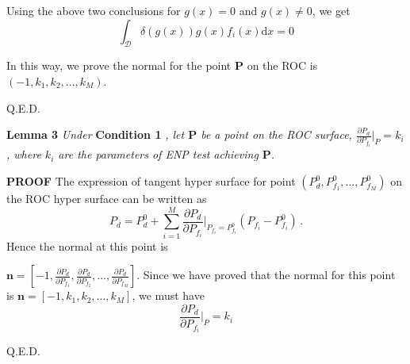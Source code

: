 Using the above two conclusions for $g(x) = 0$ and $g(x) \neq 0$, we get
\begin{equation}
\int_{\mathcal{D}} \delta (g(x)) g(x)f_i(x) \mathrm{d}x = 0
\end{equation}

In this way, we prove the normal for the point \textbf{P} on the ROC is $(-1, k_1, k_2, ..., k_M)$.

Q.E.D.

\noindent \textbf{Lemma 3}
\textit{
\noindent
Under}
\textbf{Condition 1}
\textit{, let $\mathbf{P}$ be a point on the ROC surface, $\frac{\partial P_d}{\partial P_{f_i}} \bigg|_P = k_i$, where $k_i$ are the parameters of ENP test achieving $\mathbf{P}$.
}

\noindent\textbf{PROOF}
The expression of tangent hyper surface for point $(P_d^0, P_{f_1}^0, ..., P_{f_M}^0)$ on the ROC hyper surface can be written as
\begin{equation}
P_d = P_d^0 + \sum_{i=1}^{M} \frac{\partial P_d}{\partial P_{f_i}}\bigg|_{P_{f_i} = P_{f_i}^0}(P_{f_i} - P_{f_i}^0)\,.
\end{equation}
Hence the normal at this point is

 $\mathbf{n} = [-1, \frac{\partial P_d}{\partial P_{f_1}}, \frac{\partial P_d}{\partial P_{f_2}}, ..., \frac{\partial P_d}{\partial P_{f_M}}]$. Since we have proved that  the normal for this point is $\mathbf{n} = [-1, k_1, k_2, ..., k_M]$, we must have
\begin{equation}
\frac{\partial P_d}{\partial P_{f_i}}\bigg|_{P} = k_i
\end{equation}

Q.E.D.